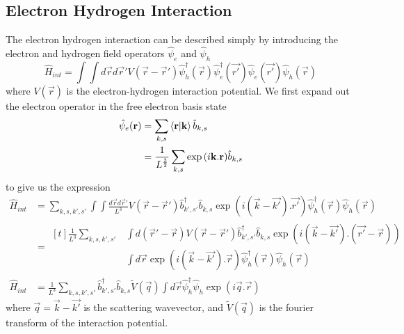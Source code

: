 \subsection{Electron Hydrogen Interaction}
The electron hydrogen interaction can
be described simply by introducing
the electron and hydrogen field
operators \(\hat{\psi}_e\) and
\(\hat{\psi}_h\)~\cite{nazarov_danon_2013}
\begin{equation}
    \hat{H}_{int} = \int\int{d\vec{r} d\vec{r}'
        V(\vec{r}-\vec{r}')
        \hat{\psi}^\dagger_h(\vec{r})
        \hat{\psi}^\dagger_e(\vec{r'})
        \hat{\psi}_e(\vec{r'})
        \hat{\psi}_h(\vec{r})}
\end{equation}
where \(V(\vec{r})\) is
the electron-hydrogen
interaction potential.
We first expand out the
electron operator in
the free electron basis state
\begin{align}
    \hat{\psi}_e(\mathbf{r}) & = \sum_{k, s}
    \braket{\mathbf{r}|\mathbf{k}}
    \hat{b}_{k, s}                                      \\
                          & = \frac{1}{L^{\frac{3}{2}}}
    \sum_{k, s} \exp{(i\mathbf{k}.\mathbf{r})}
    \hat{b}_{k, s}
\end{align}
to give us the expression
\begin{align}
    \hat{H}_{int} & =
    \sum_{k, s, k', s'} \int\int{\frac{d\vec{r} d\vec{r}'}{L^3}
        V(\vec{r}-\vec{r}')
        \hat{b}^\dagger_{k',s'}
        \hat{b}_{k, s}
        \exp{(i(\vec{k} - \vec{k'}).\vec{r'})}
        \hat{\psi}^\dagger_h(\vec{r})
    \hat{\psi}_h(\vec{r})}                       \\
                  & = \begin{aligned}[t]
        \frac{1}{L^3}
        \sum_{k, s, k', s'}
         & \int d(\vec{r}' - \vec{r})
        V(\vec{r}-\vec{r}')
        \hat{b}^\dagger_{k',s'}
        \hat{b}_{k, s}
        \exp{(i(\vec{k} - \vec{k'}).(\vec{r'} - \vec{r}))} \\
         & \int d\vec{r}
        \exp{(i(\vec{k} - \vec{k'}).\vec{r})}
        \hat{\psi}^\dagger_h(\vec{r})
        \hat{\psi}_h(\vec{r})
    \end{aligned} \\
    \hat{H}_{int} & = \frac{1}{L^3}
    \sum_{k,s,k',s'}
    \hat{b}^\dagger_{k',s'}\hat{b}_{k,s}
    \tilde{V}(\vec{q})\int{d\vec{r}
    \hat{\psi}_h^{\dagger}\hat{\psi}_h
    \exp(i\vec{q}.\vec{r})}
\end{align}
where \(\vec{q} = \vec{k} - \vec{k'}\)
is the scattering wavevector, and
\(\tilde{V}(\vec{q})\) is the
fourier transform of the interaction
potential.


